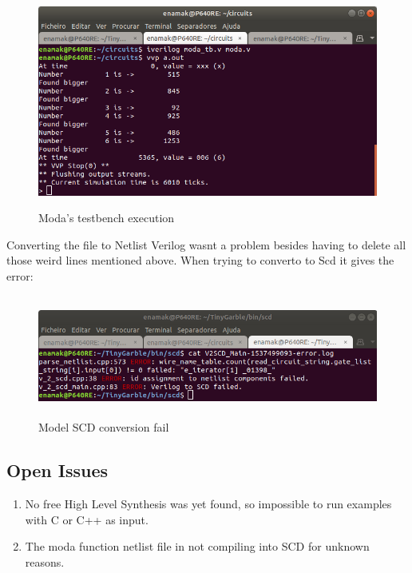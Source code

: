 \begin{refsection}
\begin{figure}[H]
	\centering
	\includegraphics[width=1\textwidth, height=7cm]{./sdf/tiny_garble/figures/moda_execution_testbench.png}
    \caption{Moda's testbench execution}\label{fig:moda_execution}
\end{figure}

Converting the file to Netlist Verilog wasnt a problem besides having to delete all those weird lines mentioned above.
When trying to converto to Scd it gives the error:

\begin{figure}[H]
	\centering
	\includegraphics[width=1\textwidth, height=4cm]{./sdf/tiny_garble/figures/tinygarble_moda_scd_fail.png}
    \caption{Model SCD conversion fail}\label{fig:moda_scd_fail}
\end{figure}


\subsection{Open Issues}

\begin{enumerate}  
\item No free High Level Synthesis was yet found, so impossible to run examples with C or C++ as input.
\item The moda function netlist file in not compiling into SCD for unknown reasons.
\end{enumerate}

\clearpage
\printbibliography[heading=subbibliography]
\end{refsection}
\cleardoublepage

